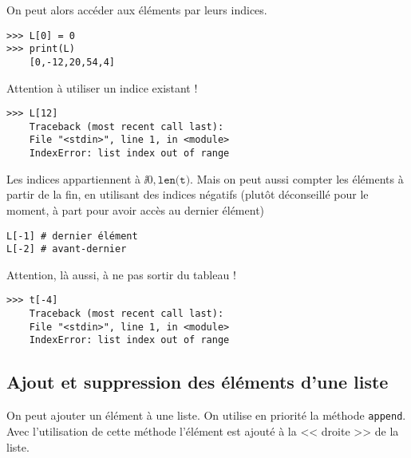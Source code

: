 

On peut alors accéder aux éléments par leurs indices. 

\begin{lstlisting}
>>> L[0] = 0
>>> print(L)
    [0,-12,20,54,4]
\end{lstlisting}


Attention à utiliser un indice existant !
\begin{lstlisting}
>>> L[12]
    Traceback (most recent call last):
    File "<stdin>", line 1, in <module>
    IndexError: list index out of range
\end{lstlisting}

%
%
%
%
%



Les indices appartiennent à $\ii{0,\texttt{len(t)}}$.
Mais on peut aussi compter les éléments à partir de la fin, en utilisant des indices négatifs (plutôt déconseillé pour le moment, à part pour avoir accès au dernier élément)
\begin{lstlisting}
L[-1] # dernier élément
L[-2] # avant-dernier
\end{lstlisting}

Attention, là aussi, à ne pas sortir du tableau !

\begin{lstlisting}
>>> t[-4]
    Traceback (most recent call last):
    File "<stdin>", line 1, in <module>
    IndexError: list index out of range
\end{lstlisting}


\subsection{Ajout et suppression des éléments d'une liste}
On peut ajouter un élément à une liste. On utilise en priorité la méthode \lstinline{append}. Avec l'utilisation de cette méthode l'élément est ajouté à la << droite >> de la liste. 

